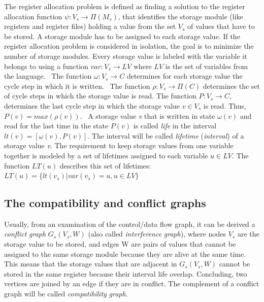 The register allocation problem is defined as finding a solution to the register allocation function $ \psi : V_s \rightarrow \Pi( M_s ) $, that identifies the storage module (like registers and register files) holding a value from the set $ V_s $ of values that have to be stored. A storage module has to be assigned to each storage value. If the register allocation problem is considered in isolation, the goal is to minimize the number of storage modules. Every storage value is labeled with the variable it belongs to using a function $ var: V_s \to LV $ where $LV$ is the set of variables from the language.~\newline
 The function $ \omega : V_s \to C $ determines for each storage value the cycle step in which it is written.~\newline
 The function $ \rho : V_s \to \Pi(C) $ determines the set of cycle steps in which the storage value is read. The function $ P: V_s \to C $, determines the last cycle step in which the storage value $ v \in V_s$ is read. Thus, $ P(v) = max(\rho(v)) $.~\newline
 A storage value {\itshape v} that is written in state $ \omega(v) $ and read for the last time in the state $ P(v) $ is called {\itshape life} in the interval $ lt(v) = [\omega(v), P(v)] $. The interval will be called {\itshape lifetime} ({\itshape interval}) of a storage value {\itshape v}. The requirement to keep storage values from one variable together is modeled by a set of lifetimes assigned to each variable $ u \in LV $. The function $ LT(u) $ describes this set of lifetimes\+: $ LT(u) = \{lt(v_s)|var(v_s) = u, u \in LV\} $\hypertarget{src_HLS_registerAllocation_page_compGraph}{}\subsection{The compatibility and conflict graphs}\label{src_HLS_registerAllocation_page_compGraph}
Usually, from an examination of the control/data flow graph, it can be derived a {\itshape conflict} {\itshape graph} $ G_s(V_s,W) $ (also called {\itshape interference} {\itshape graph}), where nodes $ V_s $ are the storage value to be stored, and edges W are pairs of values that cannot be assigned to the same storage module because they are alive at the same time. This means that the storage values that are adjacent in $ G_s(V_s,W) $ cannot be stored in the same register because their interval life overlap. Concluding, two vertices are joined by an edge if they are in conflict. The complement of a conflict graph will be called {\itshape compatibility} {\itshape graph}.~\newline
